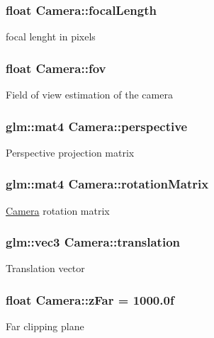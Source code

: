 \subsubsection[{focal\+Length}]{\setlength{\rightskip}{0pt plus 5cm}float Camera\+::focal\+Length}\label{class_camera_a0375653f2ef532ac566eba093c2c922d}
focal lenght in pixels \hypertarget{class_camera_aff7393c9cfbccd7e369091f00008da93}{}
\subsubsection[{fov}]{\setlength{\rightskip}{0pt plus 5cm}float Camera\+::fov}\label{class_camera_aff7393c9cfbccd7e369091f00008da93}
Field of view estimation of the camera \hypertarget{class_camera_ac4c1ee3074b5e4b70efec7d3ceb1467f}{}
\subsubsection[{perspective}]{\setlength{\rightskip}{0pt plus 5cm}glm\+::mat4 Camera\+::perspective}\label{class_camera_ac4c1ee3074b5e4b70efec7d3ceb1467f}
Perspective projection matrix \hypertarget{class_camera_a0986d4d426737e26178056e3635dc3d8}{}
\subsubsection[{rotation\+Matrix}]{\setlength{\rightskip}{0pt plus 5cm}glm\+::mat4 Camera\+::rotation\+Matrix}\label{class_camera_a0986d4d426737e26178056e3635dc3d8}
\hyperlink{class_camera}{Camera} rotation matrix \hypertarget{class_camera_ab7dbba19077d1457c557c31a215c2557}{}
\subsubsection[{translation}]{\setlength{\rightskip}{0pt plus 5cm}glm\+::vec3 Camera\+::translation}\label{class_camera_ab7dbba19077d1457c557c31a215c2557}
Translation vector \hypertarget{class_camera_a6290469f972a5903c805725db563f41f}{}
\subsubsection[{z\+Far}]{\setlength{\rightskip}{0pt plus 5cm}float Camera\+::z\+Far = 1000.\+0f}\label{class_camera_a6290469f972a5903c805725db563f41f}
Far clipping plane \hypertarget{class_camera_a1db2166635ff27594eda3a23130b66ac}{}

